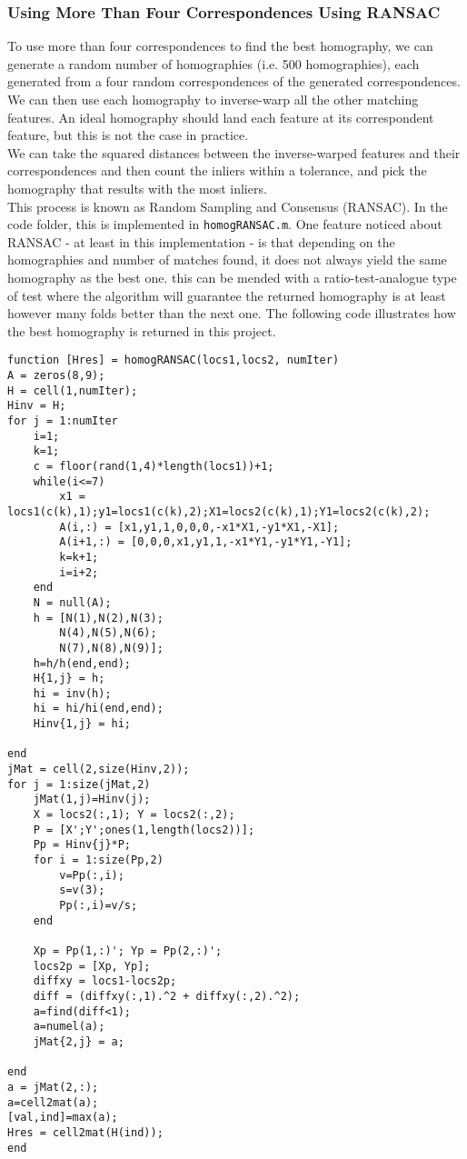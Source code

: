 \documentclass[10pt,twocolumn,letterpaper]{article}
\begin{document}
\subsubsection{Using More Than Four Correspondences Using RANSAC}
To use more than four correspondences to find the best homography, we can generate a random number of homographies (i.e. 500 homographies), each generated from a four random correspondences of the generated correspondences. We can then use each homography to inverse-warp all the other matching features. An ideal homography should land each feature at its correspondent feature, but this is not the case in practice.\\
We can take the squared distances between the inverse-warped features and their correspondences and then count the inliers within a tolerance, and pick the homography that results with the most inliers.\\
This process is known as Random Sampling and Consensus (RANSAC). In the code folder, this is implemented in \texttt{homogRANSAC.m}. One feature noticed about RANSAC - at least in this implementation - is that depending on the homographies and number of matches found, it does not always yield the same homography as the best one. this can be mended with a ratio-test-analogue type of test where the algorithm will guarantee the returned homography is at least however many folds better than the next one. The following code illustrates how the best homography is returned in this project.
\begin{lstlisting}
function [Hres] = homogRANSAC(locs1,locs2, numIter)
A = zeros(8,9);
H = cell(1,numIter);
Hinv = H;
for j = 1:numIter
    i=1;
    k=1;
    c = floor(rand(1,4)*length(locs1))+1;
    while(i<=7)
        x1 = locs1(c(k),1);y1=locs1(c(k),2);X1=locs2(c(k),1);Y1=locs2(c(k),2);
        A(i,:) = [x1,y1,1,0,0,0,-x1*X1,-y1*X1,-X1];
        A(i+1,:) = [0,0,0,x1,y1,1,-x1*Y1,-y1*Y1,-Y1];
        k=k+1;
        i=i+2;
    end
    N = null(A);
    h = [N(1),N(2),N(3);
        N(4),N(5),N(6);
        N(7),N(8),N(9)];
    h=h/h(end,end);
    H{1,j} = h;
    hi = inv(h);
    hi = hi/hi(end,end);
    Hinv{1,j} = hi;
    
end
jMat = cell(2,size(Hinv,2));
for j = 1:size(jMat,2)
    jMat(1,j)=Hinv(j);
    X = locs2(:,1); Y = locs2(:,2);
    P = [X';Y';ones(1,length(locs2))];
    Pp = Hinv{j}*P;
    for i = 1:size(Pp,2)
        v=Pp(:,i);
        s=v(3);
        Pp(:,i)=v/s;
    end
    
    Xp = Pp(1,:)'; Yp = Pp(2,:)';
    locs2p = [Xp, Yp];
    diffxy = locs1-locs2p;
    diff = (diffxy(:,1).^2 + diffxy(:,2).^2);
    a=find(diff<1);
    a=numel(a);
    jMat{2,j} = a;
    
end
a = jMat(2,:);
a=cell2mat(a);
[val,ind]=max(a);
Hres = cell2mat(H(ind));
end
\end{lstlisting}
\end{document}
